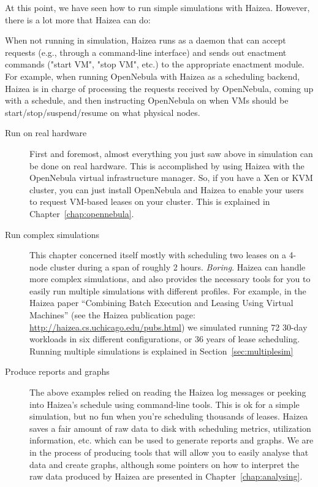 At this point, we have seen how to run simple simulations with Haizea. However, there is a lot more that Haizea can do:

When not running in simulation, Haizea runs as a daemon that can accept requests (e.g., through a command-line interface) and sends out enactment commands ("start VM", "stop VM", etc.) to the appropriate enactment module. For example, when running OpenNebula with Haizea as a scheduling backend, Haizea is in charge of processing the requests received by OpenNebula, coming up with a schedule, and then instructing OpenNebula on when VMs should be start/stop/suspend/resume on what physical nodes.

\begin{description}
\item[Run on real hardware] First and foremost, almost everything you just saw above in simulation can be done on real hardware. This is accomplished by using Haizea with the OpenNebula virtual infrastructure manager. So, if you have a Xen or KVM cluster, you can just install OpenNebula and Haizea to enable your users to request VM-based leases on your cluster. This is explained in Chapter~\ref{chap:opennebula}.
\item[Run complex simulations] This chapter concerned itself mostly with scheduling two leases on a 4-node cluster during a span of roughly 2 hours. \emph{Boring}. Haizea can handle more complex simulations, and also provides the necessary tools for you to easily run multiple simulations with different profiles. For example, in the Haizea paper ``Combining Batch Execution and Leasing Using Virtual Machines'' (see the Haizea publication page: \url{http://haizea.cs.uchicago.edu/pubs.html}) we simulated running 72 30-day workloads in six different configurations, or 36 years of lease scheduling. Running multiple simulations is explained in Section~\ref{sec:multiplesim}
\item[Produce reports and graphs] The above examples relied on reading the Haizea log messages or peeking into Haizea's schedule using command-line tools. This is ok for a simple simulation, but no fun when you're scheduling thousands of leases. Haizea saves a fair amount of raw data to disk with scheduling metrics, utilization information, etc. which can be used to generate reports and graphs. We are in the process of producing tools that will allow you to easily analyse that data and create graphs, although some pointers on how to interpret the raw data produced by Haizea are presented in Chapter~\ref{chap:analysing}.
\end{description}